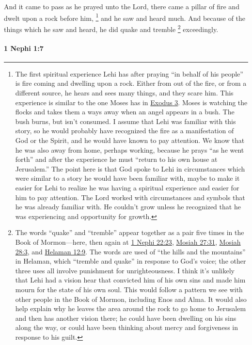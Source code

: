 			And it came to pass as he prayed unto the Lord,
			there came a pillar of fire and dwelt upon a rock before him,%
				\footnote{%
					The first spiritual experience Lehi has after praying ``in behalf of his people'' is fire coming and dwelling upon a rock. Either from out of the fire, or from a different source, he hears and sees many things, and they scare him. This experience is similar to the one Moses has in \hyperref[EXODUS-3]{Exodus 3}. Moses is watching the flocks and takes them a ways away when an angel appears in a bush. The bush burns, but isn't consumed. I assume that Lehi was familiar with this story, so he would probably have recognized the fire as a manifestation of God or the Spirit, and he would have known to pay attention. We know that he was also away from home, perhaps working, because he prays ``as he went forth'' and after the experience he must ``return to his own house at Jerusalem.'' The point here is that God spoke to Lehi in circumstances which were similar to a story he would have been familiar with, maybe to make it easier for Lehi to realize he was having a spiritual experience and easier for him to pay attention. The Lord worked with circumstances and symbols that he was already familiar with. He couldn't grow unless he recognized that he was experiencing and opportunity for growth.
					}
			and he saw and heard much.
			And because of the things which he saw and heard,
			he did quake and tremble%
			\footnote{%
				The words ``quake'' and ``tremble'' appear together as a pair five times in the Book of Mormon---here, then again at \hyperref[1NEPHI-22-23]{1 Nephi 22:23}, \hyperref[MOSIAH-27-31]{Mosiah 27:31}, \hyperref[MOSIAH-28-3]{Mosiah 28:3}, and \hyperref[HELAMAN-12-9]{Helaman 12:9}. The words are used of ``the hills and the mountains'' in Helaman, which ``tremble and quake'' in response to God's voice; the other three uses all involve punishment for unrighteousness. I think it's unlikely that Lehi had a vision hear that convicted him of his own sins and made him mourn for the state of his own soul. This would follow a pattern we see with other people in the Book of Mormon, including Enos and Alma. It would also help explain why he leaves the area around the rock to go home to Jerusalem and then has another vision there; he could have been dwelling on his sins along the way, or could have been thinking about mercy and forgiveness in response to his guilt.
				}
			exceedingly.

		\paragraph{1 Nephi 1:7} %
			\label{1NEPHI-1-7}

